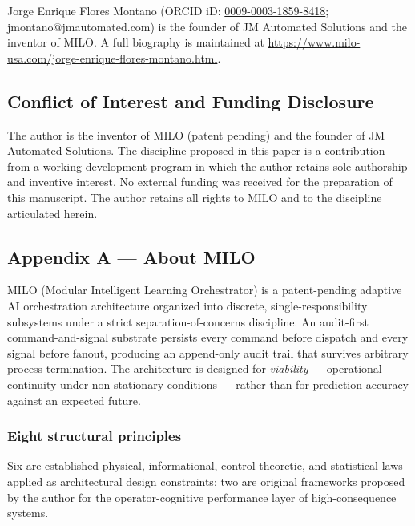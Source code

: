 Jorge Enrique Flores Montano (ORCID iD:
\href{https://orcid.org/0009-0003-1859-8418}{0009-0003-1859-8418};
jmontano@jmautomated.com) is the founder of JM Automated Solutions and
the inventor of MILO. A full biography is maintained at
\url{https://www.milo-usa.com/jorge-enrique-flores-montano.html}.

\subsection{Conflict of Interest and Funding
Disclosure}\label{conflict-of-interest-and-funding-disclosure}

The author is the inventor of MILO (patent pending) and the founder of
JM Automated Solutions. The discipline proposed in this paper is a
contribution from a working development program in which the author
retains sole authorship and inventive interest. No external funding was
received for the preparation of this manuscript. The author retains all
rights to MILO and to the discipline articulated herein.

\subsection{Appendix A --- About MILO}\label{appendix-a-about-milo}

MILO (Modular Intelligent Learning Orchestrator) is a patent-pending
adaptive AI orchestration architecture organized into discrete,
single-responsibility subsystems under a strict separation-of-concerns
discipline. An audit-first command-and-signal substrate persists every
command before dispatch and every signal before fanout, producing an
append-only audit trail that survives arbitrary process termination. The
architecture is designed for \emph{viability} --- operational continuity
under non-stationary conditions --- rather than for prediction accuracy
against an expected future.

\subsubsection{Eight structural
principles}\label{eight-structural-principles}

Six are established physical, informational, control-theoretic, and
statistical laws applied as architectural design constraints; two are
original frameworks proposed by the author for the operator-cognitive
performance layer of high-consequence systems.

